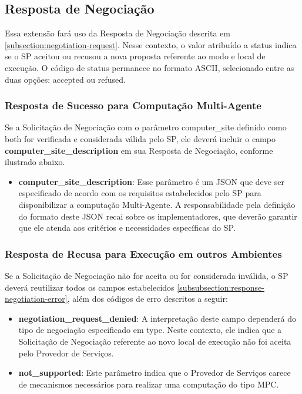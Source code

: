\subsection{Resposta de Negociação}

Essa extensão fará uso da Resposta de Negociação descrita em \autoref{subsection:negotiation-request}. Nesse contexto, o valor atribuído a status indica se o \acs{SP} aceitou ou recusou a nova proposta referente ao modo e local de execução. O código de status permanece no formato ASCII, selecionado entre as duas opções: accepted ou refused.



\subsubsection{Resposta de Sucesso para Computação Multi-Agente}

Se a Solicitação de Negociação com o parâmetro computer\_site definido como both for verificada e considerada válida pelo \acs{SP}, ele deverá incluir o campo \textbf{computer\_site\_description} em sua Resposta de Negociação, conforme ilustrado abaixo.



\begin{itemize}
    \item \textbf{computer\_site\_description}: Esse parâmetro é um \acs{JSON} que deve ser especificado de acordo com os requisitos estabelecidos pelo \acs{SP} para disponibilizar a computação Multi-Agente. A responsabilidade pela definição do formato deste \acs{JSON} recai sobre os implementadores, que deverão garantir que ele atenda aos critérios e necessidades específicas do \acs{SP}.
\end{itemize}

\subsubsection{Resposta de Recusa para Execução em outros Ambientes}

Se a Solicitação de Negociação não for aceita ou for considerada inválida, o \acs{SP} deverá reutilizar todos os campos estabelecidos \autoref{subsubsection:response-negotiation-error}, além dos códigos de erro descritos a seguir:

\begin{itemize}
    \item \textbf{negotiation\_request\_denied}:  A interpretação deste campo dependerá do tipo de negociação especificado em type. Neste contexto, ele indica que a Solicitação de Negociação referente ao novo local de execução não foi aceita pelo Provedor de Serviços.

    \item \textbf{not\_supported}: Este parâmetro indica que o Provedor de Serviços carece de mecanismos necessários para realizar uma computação do tipo \acs{MPC}.
    
\end{itemize}

